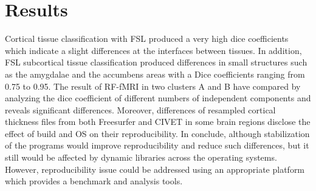 \documentclass[a4paper]{article}
\begin{document}
\section{Results}
\begin{itemize}
Cortical tissue classification with FSL produced a very high dice coefficients which indicate a slight differences at the interfaces between tissues. In addition, FSL subcortical tissue classification produced differences in small structures such as the amygdalae and the accumbens areas with a Dice coefficients ranging from 0.75 to 0.95. 
The result of RF-fMRI in two clusters A and B have compared by analyzing the dice coefficient of different numbers of independent components and reveals significant differences. Moreover, differences of resampled cortical thickness files from both Freesurfer and CIVET in some brain regions disclose the effect of build and OS on their reproducibility.
In conclude, although stabilization of the programs would improve reproducibility and reduce such differences, but it still would be affected by dynamic libraries across the operating systems. However, reproducibility issue could be addressed using an appropriate platform which provides a benchmark and analysis tools.

\end{itemize}
\end{document}
